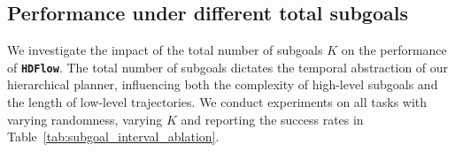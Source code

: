 \documentclass{article} %
\begin{document}
\subsection{Performance under different total subgoals}
We investigate the impact of the total number of subgoals \(K\) on the performance of \texttt{\textbf{HDFlow}}. The total number of subgoals dictates the temporal abstraction of our hierarchical planner, influencing both the complexity of high-level subgoals and the length of low-level trajectories. We conduct experiments on all tasks with varying randomness, varying \(K\) and reporting the success rates in Table~\ref{tab:subgoal_interval_ablation}.

\begin{table*}[h]
    \centering
    \caption{\small Ablation study on the choice of total subgoals \(K\). Success rates (\%) of \texttt{\textbf{HDFlow}} on all tasks with respective randomization levels for different \(K\) values, highlighting the importance of temporal abstraction for optimal performance.}
    \label{tab:subgoal_interval_ablation}
\end{table*}
\end{document}

